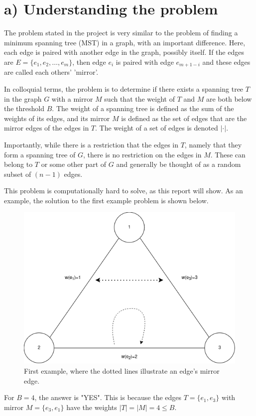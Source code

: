\section*{a) Understanding the problem}

The problem stated in the project is very similar to the problem of finding a minimum spanning tree (MST) in a graph, with an important difference. Here, each edge is paired with another edge in the graph, possibly itself. If the edges are $E=\{e_1,e_2,\dotsc,e_m\}$, then edge $e_i$ is paired with edge $e_{m+1-i}$ and these edges are called each others' 'mirror'. 

In colloquial terms, the problem is to determine if there exists a spanning tree $T$ in the graph $G$ with a mirror $M$ such that the weight of $T$ and $M$ are both below the threshold $B$. The weight of a spanning tree is defined as the sum of the weights of its edges, and its mirror $M$ is defined as the set of edges that are the mirror edges of the edges in $T$. The weight of a set of edges is denoted $|\cdot|$.

Importantly, while there is a restriction that the edges in $T$, namely that they form a spanning tree of $G$, there is no restriction on the edges in $M$. These can belong to $T$ or some other part of $G$ and generally be thought of as a random subset of $(n-1)$ edges. 

This problem is computationally hard to solve, as this report will show. As an example, the solution to the first example problem is shown below. 

\begin{figure}[h]
    \centering
    \includegraphics[width=0.7\linewidth]{Latex/Billeder/a_example.png}
    \caption{First example, where the dotted lines illustrate an edge's mirror edge.}
    \label{fig:a_example}
\end{figure}

For $B=4$, the answer is "YES". This is because the edges $T=\{e_1,e_3\}$ with mirror $M=\{e_3,e_1\}$ have the weights $|T|=|M|=4\leq B$.  
